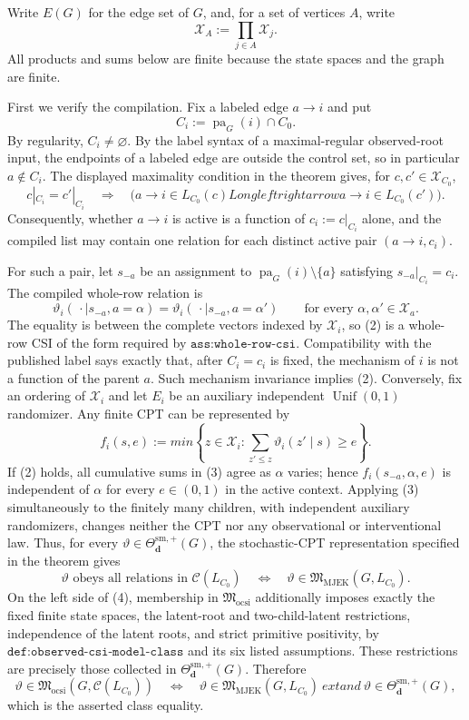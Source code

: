 Write \(E(G)\) for the edge set of \(G\), and, for a set of vertices \(A\), write
\[
\mathcal X_A:=\prod_{j\in A}\mathcal X_j.
\]
All products and sums below are finite because the state spaces and the graph are finite.

First we verify the compilation.  Fix a labeled edge \(a\to i\) and put
\[
C_i:=\operatorname{pa}_G(i)\cap C_0.
\]
By regularity, \(C_i\ne\varnothing\).  By the label syntax of a maximal-regular observed-root input, the endpoints of a labeled edge are outside the control set, so in particular \(a\notin C_i\).  The displayed maximality condition in the theorem gives, for \(c,c'\in\mathcal X_{C_0}\),
\[
c|_{C_i}=c'|_{C_i}
\quad\Longrightarrow\quad
\bigl(a\to i\in L_{C_0}(c)Longleftrightarrow
      a\to i\in L_{C_0}(c')\bigr).
\tag{1}
\]
Consequently, whether \(a\to i\) is active is a function of \(c_i:=c|_{C_i}\) alone, and the compiled list may contain one relation for each distinct active pair \((a\to i,c_i)\).

For such a pair, let \(s_{-a}\) be an assignment to \(\operatorname{pa}_G(i)\setminus\{a\}\) satisfying \(s_{-a}|_{C_i}=c_i\).  The compiled whole-row relation is
\[
\vartheta_i(\,\cdot\mid s_{-a},a=\alpha)
=
\vartheta_i(\,\cdot\mid s_{-a},a=\alpha')
\qquad
\text{for every }\alpha,\alpha'\in\mathcal X_a.
\tag{2}
\]
The equality is between the complete vectors indexed by \(\mathcal X_i\), so (2) is a whole-row CSI of the form required by \(\texttt{ass:whole-row-csi}\).  Compatibility with the published label says exactly that, after \(C_i=c_i\) is fixed, the mechanism of \(i\) is not a function of the parent \(a\).  Such mechanism invariance implies (2).  Conversely, fix an ordering of \(\mathcal X_i\) and let \(E_i\) be an auxiliary independent \(\operatorname{Unif}(0,1)\) randomizer.  Any finite CPT can be represented by
\[
f_i(s,e):=min\left\{z\in\mathcal X_i:
  \sum_{z'\le z}\vartheta_i(z'\mid s)\ge e\right\}.
\tag{3}
\]
If (2) holds, all cumulative sums in (3) agree as \(\alpha\) varies; hence \(f_i(s_{-a},\alpha,e)\) is independent of \(\alpha\) for every \(e\in(0,1)\) in the active context.  Applying (3) simultaneously to the finitely many children, with independent auxiliary randomizers, changes neither the CPT nor any observational or interventional law.  Thus, for every \(\vartheta\in\Theta^{\mathrm{sm},+}_{\mathbf d}(G)\), the stochastic-CPT representation specified in the theorem gives
\[
\vartheta\text{ obeys all relations in }\mathcal C(L_{C_0})
\quad\Longleftrightarrow\quad
\vartheta\in\mathfrak M_{\mathrm{MJEK}}(G,L_{C_0}).
\tag{4}
\]
On the left side of (4), membership in \(\mathfrak M_{\mathrm{ocsi}}\) additionally imposes exactly the fixed finite state spaces, the latent-root and two-child-latent restrictions, independence of the latent roots, and strict primitive positivity, by \(\texttt{def:observed-csi-model-class}\) and its six listed assumptions.  These restrictions are precisely those collected in \(\Theta^{\mathrm{sm},+}_{\mathbf d}(G)\).  Therefore
\[
\vartheta\in
\mathfrak M_{\mathrm{ocsi}}\!\left(G,\mathcal C(L_{C_0})\right)
\quad\Longleftrightarrow\quad
\vartheta\in\mathfrak M_{\mathrm{MJEK}}(G,L_{C_0})
\ 	ext{and}\ 
\vartheta\in\Theta^{\mathrm{sm},+}_{\mathbf d}(G),
\tag{5}
\]
which is the asserted class equality.

